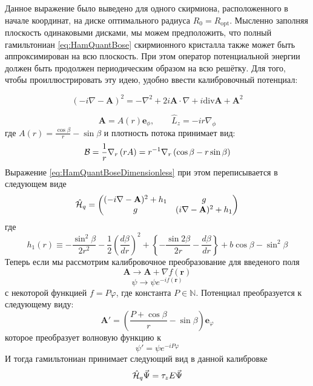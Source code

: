 \documentclass[a4paper,article,14pt]{extarticle}
\begin{document}
Данное выражение было выведено для одного скирмиона, расположенного в начале координат, на диске оптимального радиуса $R_0=R_\text{opt}$. Мысленно заполняя плоскость одинаковыми дисками, мы можем предположить, что полный гамильтониан \eqref{eq:HamQuantBose} скирмионного кристалла также может быть аппроксимирован на всю плоскость. При этом оператор потенциальной энергии должен быть продолжен периодическим образом на всю решётку. Для того, чтобы проиллюстрировать эту идею, удобно ввести калибровочный потенциал:


\begin{equation}
(- i \nabla - \mathbf{A} ) ^ 2 = - \nabla ^ 2 + 2 i \mathbf{A} \cdot \nabla + i \text{div} \mathbf{A}  + \mathbf{A}^2
\end{equation}

$$
\mathbf{A} = A(r) \mathbf{e}_\phi ,  \qquad  \hat{L}_{z} = - i r \nabla_\phi
$$
где $A(r) = \frac{ \cos\beta } { r } - \sin \beta$ и плотность потока принимает вид:
$$
{\cal B}  = \frac 1 r \nabla_r \left(r A \right) = 
r^{-1}  \nabla_r \left(\cos\beta   -  r  \sin \beta \right)  
$$
Выражение \eqref{eq:HamQuantBoseDimensionless} при этом переписывается в следующем виде
\begin{equation}
\hat {\cal H}_{q} =\begin{pmatrix} (- i \nabla - \mathbf{A} ) ^ 2 + h_1 & g \\ g & ( i \nabla - \mathbf{A} ) ^ 2 + h_1 \end{pmatrix}
\end{equation}
где
\begin{equation}
h_1(r) \equiv  -\frac{\sin^2 \beta }{2r^2} - \frac{1}{2}\left( \frac{d\beta }{dr} \right)^2 +  \left\{  - \frac{\sin 2\beta }{2r}  - \frac{d\beta }{dr} \right\} + b\cos \beta - \sin ^ 2 \beta
\end{equation}
Теперь если мы рассмотрим калибровочное преобразование для введеного поля 
$$
\mathbf{A} \rightarrow \mathbf{A} + \nabla f(\mathbf{r})
$$
$$
\psi \rightarrow \psi e ^ {- i f(\mathbf{r})}
$$
с некоторой функцией  $f = P \varphi$, где константа $P \in \mathbb{N}$. Потенциал преобразуется к следующему виду:
$$
\mathbf{A'}= \left(\frac {P + \cos{\beta}} {r} - \sin{\beta} \right) \mathbf{e}_\varphi
$$
которое преобразует волновую функцию к
$$
\psi' = \psi e^{-i P \varphi} 
$$
И тогда гамильтониан принимает следующий вид в данной калибровке
\begin{equation}
\label{eq:init_ham_landau}
\hat {\cal H}_{q} \vec{\Psi} = \tau_z E \vec{\Psi}
\end{equation}
\end{document}
